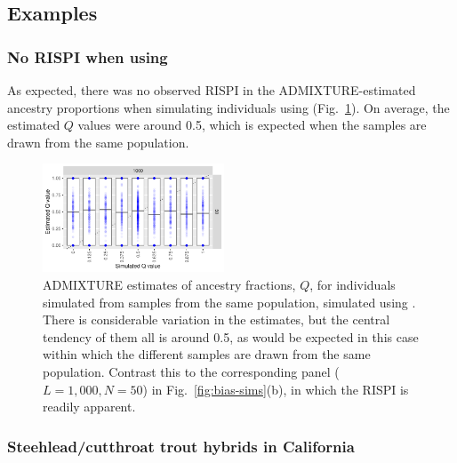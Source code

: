 {\subsection*{Examples}

\subsubsection*{No RISPI when using \gscramble{}}

As expected, there was no observed RISPI in the ADMIXTURE-estimated
ancestry proportions  when simulating individuals
using \gscramble{} (Fig.~\ref{fig:norispi}).  On average, the estimated $Q$ values
were around 0.5, which is expected when the samples are drawn from the same
population.
\begin{figure}
\newcommand{\gssimcap}{\footnotesize ADMIXTURE estimates of ancestry
fractions, $Q$, for individuals simulated from samples from the same population,
simulated using \gscramble{}.  There is considerable variation in the estimates,
but the central tendency of them all is around 0.5, as would be expected in this case
within which the different
samples are drawn from the same population.  Contrast this to the corresponding panel ($L=1,000, N=50$) in Fig.~\ref{fig:bias-sims}(b),
in which the RISPI is readily apparent.}
\includegraphics[width=0.48\textwidth]{figures/gscram_supervised_Qs.pdf}
\caption[\gssimcap]{\gssimcap}
\label{fig:norispi}
\end{figure}

\subsubsection*{Steehlead/cutthroat trout hybrids in California}

}
